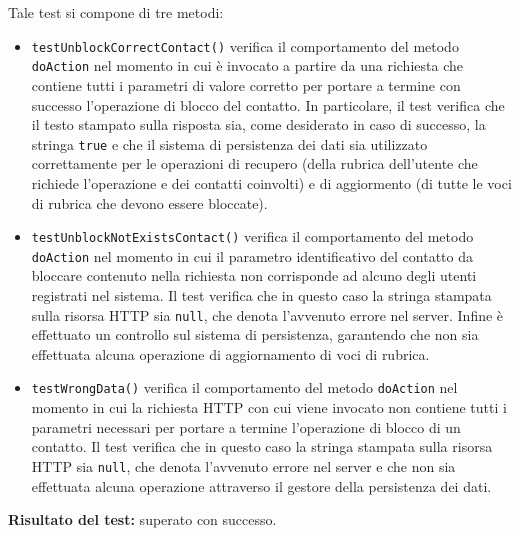 \begin{itemize}
Tale test si compone di tre metodi:
\begin{itemize}
\item \texttt{testUnblockCorrectContact()} verifica il comportamento del metodo \texttt{doAction} nel momento in cui è invocato a partire da una richiesta che contiene tutti i parametri di valore corretto per portare a termine con successo l'operazione di blocco del contatto. In particolare, il test verifica che il testo stampato sulla risposta sia, come desiderato in caso di successo, la stringa \texttt{true} e che il sistema di persistenza dei dati sia utilizzato correttamente per le operazioni di recupero (della rubrica dell'utente che richiede l'operazione e dei contatti coinvolti) e di aggiormento (di tutte le voci di rubrica che devono essere bloccate).

\item \texttt{testUnblockNotExistsContact()} verifica il comportamento del metodo \texttt{doAction} nel momento in cui il parametro identificativo del contatto da bloccare contenuto nella richiesta non corrisponde ad alcuno degli utenti registrati nel sistema.
Il test verifica che in questo caso la stringa stampata sulla risorsa HTTP sia \texttt{null}, che denota l'avvenuto errore nel server. Infine è effettuato un controllo sul sistema di persistenza, garantendo che non sia effettuata alcuna operazione di aggiornamento di voci di rubrica.

\item \texttt{testWrongData()} verifica il comportamento del metodo \texttt{doAction} nel momento in cui la richiesta HTTP con cui viene invocato non contiene tutti i parametri necessari per portare a termine l'operazione di blocco di un contatto.
Il test verifica che in questo caso la stringa stampata sulla risorsa HTTP sia \texttt{null}, che denota l'avvenuto errore nel server e che non sia effettuata alcuna operazione attraverso il gestore della persistenza dei dati.

\end{itemize}
\textbf{Risultato del test:} superato con successo.

\end{itemize}


